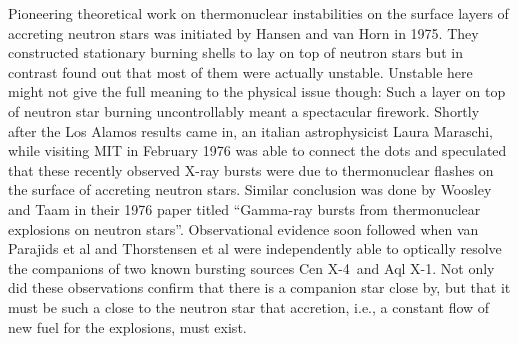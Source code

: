 %
%
Pioneering theoretical work on thermonuclear instabilities on the surface layers of accreting neutron stars was initiated by Hansen and van Horn in 1975.\cite{HvH75}
They constructed stationary burning shells to lay on top of neutron stars but in contrast found out that most of them were actually unstable.
Unstable here might not give the full meaning to the physical issue though:
Such a layer on top of neutron star burning uncontrollably meant a spectacular firework.
Shortly after the Los Alamos results came in, an italian astrophysicist Laura Maraschi, while visiting MIT in February 1976 was able to connect the dots and speculated that these recently observed X-ray bursts were due to thermonuclear flashes on the surface of accreting neutron stars.\cite{MC77, Lewin93}
Similar conclusion was done by Woosley and Taam in their 1976 paper titled ``Gamma-ray bursts from thermonuclear explosions on neutron stars''.
Observational evidence soon followed when van Parajids et al and Thorstensen et al were independently able to optically resolve the companions of two known bursting sources Cen X-4\cite{vPV80} and Aql X-1\cite{TCB78}.
Not only did these observations confirm that there is a companion star close by, but that it must be such a close to the neutron star that accretion, i.e., a constant flow of new fuel for the explosions, must exist.


